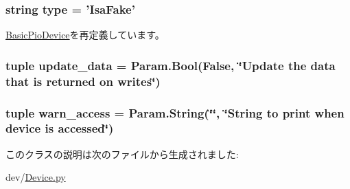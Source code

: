 \label{classDevice_1_1IsaFake_ab96c3091d240ed1b0dffe8dc116caae7}
\hypertarget{classDevice_1_1IsaFake_acce15679d830831b0bbe8ebc2a60b2ca}{
\subsubsection[{type}]{\setlength{\rightskip}{0pt plus 5cm}string {\bf type} = '{\bf IsaFake}'}}
\label{classDevice_1_1IsaFake_acce15679d830831b0bbe8ebc2a60b2ca}


\hyperlink{classDevice_1_1BasicPioDevice_acce15679d830831b0bbe8ebc2a60b2ca}{BasicPioDevice}を再定義しています。\hypertarget{classDevice_1_1IsaFake_aae00bf98162cfa3f52fce67187bd11ec}{
\subsubsection[{update\_\-data}]{\setlength{\rightskip}{0pt plus 5cm}tuple {\bf update\_\-data} = Param.Bool(False, \char`\"{}Update the data that is returned on writes\char`\"{})}}
\label{classDevice_1_1IsaFake_aae00bf98162cfa3f52fce67187bd11ec}
\hypertarget{classDevice_1_1IsaFake_af7b2eb9eea2b844c9c2ebc0914c8ac6b}{
\subsubsection[{warn\_\-access}]{\setlength{\rightskip}{0pt plus 5cm}tuple {\bf warn\_\-access} = Param.String(\char`\"{}\char`\"{}, \char`\"{}String to print when device is accessed\char`\"{})}}
\label{classDevice_1_1IsaFake_af7b2eb9eea2b844c9c2ebc0914c8ac6b}


このクラスの説明は次のファイルから生成されました:\begin{DoxyCompactItemize}
\item 
dev/\hyperlink{Device_8py}{Device.py}\end{DoxyCompactItemize}
